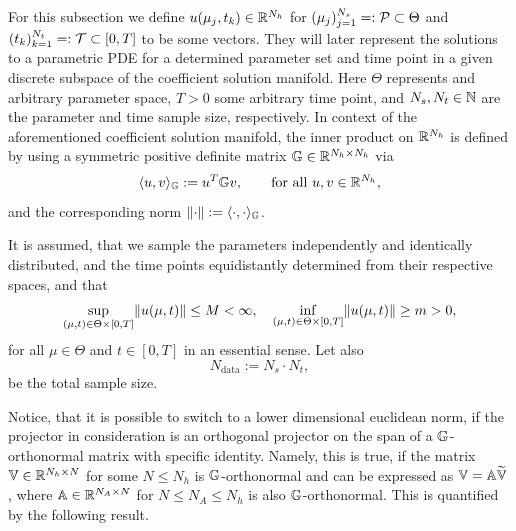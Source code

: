 For this subsection we define $u(\mu_j, t_k) \in \mathbb{R}^{N_h}$ for $(\mu_j)_{j = 1}^{N_s} =: \mathcal{P} \subset \Theta$ and 
$(t_k)_{k = 1}^{N_t} =: \mathcal{T} \subset [0, T]$ to be some vectors. They will later represent the solutions to a 
parametric PDE for a 
determined parameter set and time point in a given discrete subspace of the coefficient solution manifold. 
Here $\Theta$ represents and arbitrary parameter space, 
$T > 0$ some arbitrary time point, and $N_s, N_t \in \mathbb{N}$ are the parameter and time sample size, respectively. 
In context of the aforementioned coefficient solution manifold,
the inner product on $\mathbb{R}^{N_h}$ is defined by 
using a symmetric positive definite matrix $\mathbb{G} \in \mathbb{R}^{N_h \times N_h}$ via 
\begin{equation*}
    \langle u, v \rangle_{\mathbb{G}} := u^T \mathbb{G} v, \qquad \text{for all } u, v \in \mathbb{R}^{N_h},
\end{equation*}
and the corresponding norm $\lVert \cdot \rVert := \langle \cdot, \cdot \rangle_{\mathbb{G}}$.

It is assumed,
that we sample the parameters independently and identically distributed, and the time points equidistantly determined
from their respective spaces, and that 
\begin{equation*}
    \sup\limits_{(\mu, t) \in \Theta \times [0, T]} \lVert u(\mu, t) \rVert \leq M < \infty, \quad \inf\limits_{(\mu, t) \in \Theta \times [0, T]}\lVert u(\mu, t) \rVert \geq m > 0,
\end{equation*}
for all $\mu \in \Theta$ and $t \in [0, T]$ in an essential
sense. Let also 
\begin{equation*}
    N_\text{data} := N_s \cdot N_t,
\end{equation*}
be the total sample size.

Notice, that it is possible to switch to a lower dimensional euclidean norm, if the projector in consideration
is an orthogonal projector on the span of a $\mathbb{G}$-orthonormal matrix with specific identity. Namely, this is true,
if the matrix $\mathbb{V} \in \mathbb{R}^{N_h \times N}$ 
for some $N \leq N_h$ is
$\mathbb{G}$-orthonormal and can be expressed as $\mathbb{V} = \mathbb{A} \widetilde{\mathbb{V}}$, where $\mathbb{A} \in \mathbb{R}^{N_A \times N}$
for $N \leq N_A \leq N_h$ is also $\mathbb{G}$-orthonormal. This is quantified by the following result.

